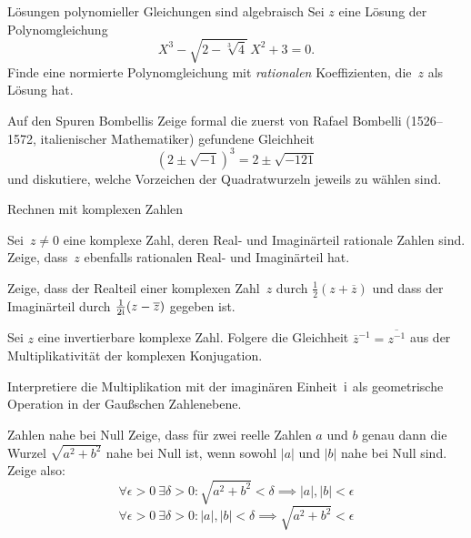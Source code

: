 \documentclass{algblatt}
\begin{document}

\begin{aufgabe}{Lösungen polynomieller Gleichungen sind algebraisch}
Sei $z$ eine Lösung der Polynomgleichung
\[ X^3 - \sqrt{2 - \sqrt[3] 4} \, X^2 + 3 = 0. \]
Finde eine normierte Polynomgleichung mit \emph{rationalen} Koeffizienten,
die~$z$ als Lösung hat.
\end{aufgabe}

\begin{aufgabe}{Auf den Spuren Bombellis}
Zeige formal die zuerst von Rafael Bombelli (1526--1572, italienischer
Mathematiker) gefundene
Gleichheit
\[
    (2 \pm \sqrt{-1})^3 = 2 \pm \sqrt{- 121}
\]
und diskutiere, welche Vorzeichen der Quadratwurzeln jeweils zu wählen sind.
\end{aufgabe}

\begin{aufgabeE}{Rechnen mit komplexen Zahlen}
\item
Sei~$z \neq 0$ eine komplexe Zahl, deren Real- und Imaginärteil rationale
Zahlen sind. Zeige, dass~$z$ ebenfalls rationalen Real- und Imaginärteil
hat.
\item
Zeige, dass der Realteil einer komplexen Zahl~$z$ durch
\(\frac 1 2 (z + \overline z)\)
und dass der Imaginärteil durch \(\frac 1 {2 \mathrm{i}} (z - \overline z)\)
gegeben ist.
\item
Sei \(z\) eine invertierbare komplexe Zahl. Folgere die Gleichheit
$
    \overline{z}^{-1} = \overline{z^{-1}}
$
aus der Multiplikativität der komplexen Konjugation.
\item
Interpretiere die Multiplikation mit der imaginären Einheit~$\mathrm{i}$
als geometrische Operation in der Gaußschen Zahlenebene.
\end{aufgabeE}

\begin{aufgabe}{Zahlen nahe bei Null}
Zeige, dass für zwei reelle Zahlen $a$ und $b$ genau dann die Wurzel
$\sqrt{a^2 + b^2}$ nahe bei Null ist, wenn sowohl $|a|$ und $|b|$
nahe bei Null sind. Zeige also:
\[    \forall \epsilon > 0\ \exists \delta > 0  \colon 
        \sqrt{a^2 + b^2} < \delta  \implies |a|, |b| < \epsilon
\]
\[
    \forall \epsilon > 0\ \exists \delta > 0  \colon 
        |a|, |b| < \delta  \implies \sqrt{a^2  + b^2} < \epsilon
\]
\vspace{-1em}
\end{aufgabe}
\end{document}
